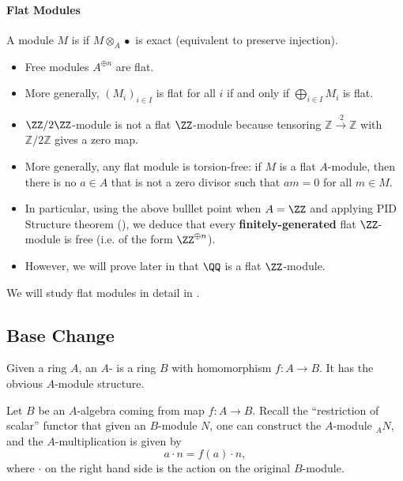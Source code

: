 \paragraph{Flat Modules}
\begin{definition} 
\label{def: flat}
    A module $M$ is  if $M\otimes_A \bullet$ is exact
    (equivalent to preserve injection).
\end{definition}
\begin{example}
    \label{ex:flat}
    \begin{itemize}
    \item Free modules $A^{\oplus n}$ are flat.
    \item  More generally, $(M_i)_{i\in I}$ is flat
    for all $i$ if and only if  $\bigoplus_{i\in I} M_i$ is flat.
    \item $\ZZ/2\ZZ$-module is 
    not a flat $\ZZ$-module because 
    tensoring $\mathbb Z \stackrel{\cdot 2}{\longrightarrow} \mathbb Z$ with $\mathbb Z/2\mathbb Z$
    gives a zero map.
    \item More generally, any flat module is torsion-free:
    if $M$ is a flat $A$-module,
    then there is no $a\in A$ that is not a zero divisor
    such that $am=0$ for all $m\in M$.
    \item In particular, using the above bulllet point when $A=\ZZ$ and applying PID Structure theorem (), we deduce that every \textbf{finitely-generated} flat $\ZZ$-module is free (i.e. of the form $\ZZ^{\oplus n}$).
    \item However, we will prove later in 
    that $\QQ$ is a flat $\ZZ$-module.
    \end{itemize}
\end{example}

We will study flat modules in detail in 
.

\subsection{Base Change}
\begin{definition}[$A$-algebra]
    Given a ring $A$, an $A$- is a ring $B$
    with homomorphism $f : A\to B$.
    It has the obvious $A$-module structure.
\end{definition}
Let $B$ be an $A$-algebra coming from map $f : A\to B$.
Recall the ``restriction of scalar'' functor that given
an $B$-module $N$, one can construct the $A$-module
$_A N$, and the $A$-multiplication is given by 
$$a\cdot n = f(a)\cdot n,$$
where $\cdot$ on the right hand side is the action on the 
original $B$-module.

